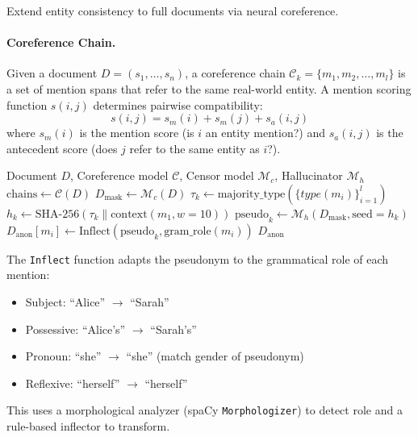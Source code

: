 \documentclass[11pt, a4paper]{article}
\begin{document}
Extend entity consistency to full documents via neural coreference.

\paragraph{Coreference Chain.}
Given a document $D = (s_1, \ldots, s_n)$, a coreference chain $\mathcal{C}_k = \{m_1, m_2, \ldots, m_l\}$ is a set of mention spans that refer to the same real-world entity. A mention scoring function $s(i, j)$ determines pairwise compatibility:
\begin{equation}
s(i, j) = s_m(i) + s_m(j) + s_a(i, j)
\end{equation}
where $s_m(i)$ is the mention score (is $i$ an entity mention?) and $s_a(i, j)$ is the antecedent score (does $j$ refer to the same entity as $i$?).

\begin{algorithm}[H]
\caption{Document-Level Coreference-Aware Anonymization}
\label{alg:coref_anon}
\begin{algorithmic}[1]
\Require Document $D$, Coreference model $\mathcal{C}$, Censor model $\mathcal{M}_c$, Hallucinator $\mathcal{M}_h$
\State $\text{chains} \leftarrow \mathcal{C}(D)$ 
\State $D_{\text{mask}} \leftarrow \mathcal{M}_c(D)$ 
    \State $\tau_k \leftarrow \text{majority\_type}(\{type(m_i)\}_{i=1}^{l})$
    \State $h_k \leftarrow \text{SHA-256}(\tau_k \| \text{context}(m_1, w{=}10))$ 
    \State $\text{pseudo}_k \leftarrow \mathcal{M}_h(D_{\text{mask}}, \text{seed}=h_k)$
        \State $D_{\text{anon}}[m_i] \leftarrow \text{Inflect}(\text{pseudo}_k, \text{gram\_role}(m_i))$
    \EndFor
\EndFor
\State \Return $D_{\text{anon}}$
\end{algorithmic}
\end{algorithm}

\begin{keyresult}
The \texttt{Inflect} function adapts the pseudonym to the grammatical role of each mention:
\begin{itemize}[nosep]
  \item Subject: ``Alice'' $\rightarrow$ ``Sarah''
  \item Possessive: ``Alice's'' $\rightarrow$ ``Sarah's''
  \item Pronoun: ``she'' $\rightarrow$ ``she'' (match gender of pseudonym)
  \item Reflexive: ``herself'' $\rightarrow$ ``herself''
\end{itemize}
This uses a morphological analyzer (spaCy \texttt{Morphologizer}) to detect role and a rule-based inflector to transform.
\end{keyresult}
\end{document}
